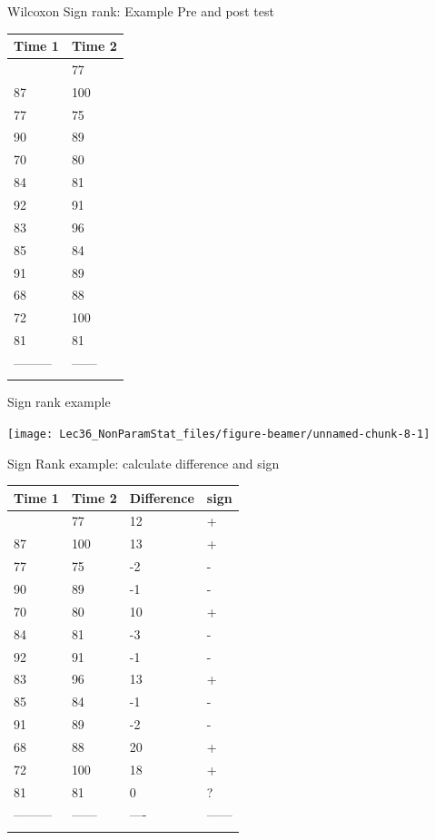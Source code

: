 \documentclass[
  ignorenonframetext,
  aspectratio=169]{beamer}
\begin{document}
\begin{frame}{Wilcoxon Sign rank: Example Pre and post test}
\protect\hypertarget{wilcoxon-sign-rank-example-pre-and-post-test}{}
\begin{longtable}[]{@{}ll@{}}
\toprule\noalign{}
Time 1 & Time 2 \\
\midrule\noalign{}
\endhead
65 & 77 \\
87 & 100 \\
77 & 75 \\
90 & 89 \\
70 & 80 \\
84 & 81 \\
92 & 91 \\
83 & 96 \\
85 & 84 \\
91 & 89 \\
68 & 88 \\
72 & 100 \\
81 & 81 \\
--------- & ------ \\
\bottomrule\noalign{}
\end{longtable}
\end{frame}

\begin{frame}{Sign rank example}
\protect\hypertarget{sign-rank-example}{}
\begin{center}\texttt{[image: Lec36\_NonParamStat\_files/figure-beamer/unnamed-chunk-8-1]} \end{center}
\end{frame}

\begin{frame}{Sign Rank example: calculate difference and sign}
\protect\hypertarget{sign-rank-example-calculate-difference-and-sign}{}
\begin{longtable}[]{@{}llll@{}}
\toprule\noalign{}
Time 1 & Time 2 & Difference & sign \\
\midrule\noalign{}
\endhead
65 & 77 & 12 & + \\
87 & 100 & 13 & + \\
77 & 75 & -2 & - \\
90 & 89 & -1 & - \\
70 & 80 & 10 & + \\
84 & 81 & -3 & - \\
92 & 91 & -1 & - \\
83 & 96 & 13 & + \\
85 & 84 & -1 & - \\
91 & 89 & -2 & - \\
68 & 88 & 20 & + \\
72 & 100 & 18 & + \\
81 & 81 & 0 & ? \\
--------- & ------ & ---- & ------ \\
\bottomrule\noalign{}
\end{longtable}
\end{frame}
\end{document}
